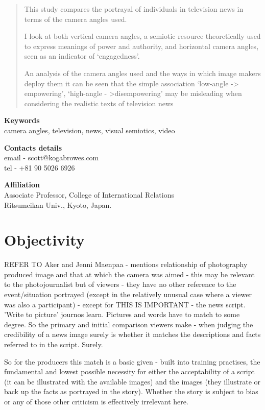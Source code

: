 
\def\mytitle{Interpretation of camera angles in television news}
\def\myauthor{Scott Koga-Browes}


\begin{abstract}
\label{abstract}
\noindent
This study compares the portrayal of individuals in television news in terms of the camera angles used.

I look at both vertical camera angles, a semiotic resource theoretically used to express meanings of power and authority, and horizontal camera angles, seen as an indicator of ‘engagedness’.

An analysis of the camera angles used and the ways in which image makers deploy them it can be seen that the simple association ‘low-angle -> empowering’, ‘high-angle - >disempowering’ may be misleading when considering the realistic texts of television news
\end{abstract}

\noindent
{\bf Keywords}\\
camera angles, television, news, visual semiotics, video
\medskip

\noindent
{\bf Contacts details}\\
email - scott@kogabrowes.com\\
tel - +81 90 5026 6926
\medskip

\noindent
{\bf Affiliation}\\
Associate Professor, College of International Relations\\
Ritsumeikan Univ., Kyoto, Japan.

\section{Objectivity}

\red
REFER TO Aker and Jenni Maenpaa - mentions relationship of photography produced image and that at which the camera was aimed - this may be relevant to the photojournalist but of viewers - they have no other reference to the event/situation portrayed (except in the relatively unusual case where a viewer was also a participant) - except for THIS IS IMPORTANT - the news script. 'Write to picture' journos learn. Pictures and words have to match to some degree. So the primary and initial comparison viewers make - when judging the credibility of a news image surely is whether it matches the descriptions and facts referred to in the script. Surely. 

So for the producers this match is a basic given - built into training practises, the fundamental and lowest possible necessity for either the acceptability of a script (it can be illustrated with the available images) and the images (they illustrate or back up the facts as portrayed in the story). Whether the story is subject to bias or any of those other criticism is effectively irrelevant here. 

